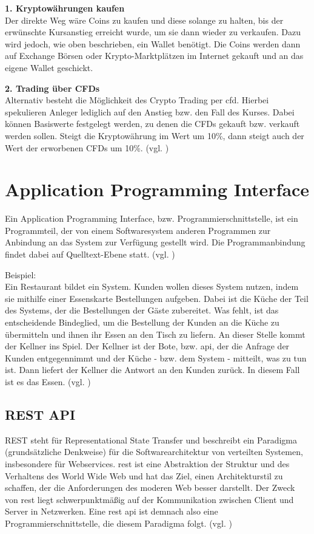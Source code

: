 \documentclass[oneside]{ausarbeitung}
\begin{document}
\textbf{1. Kryptowährungen kaufen} \\
Der direkte Weg wäre Coins zu kaufen und diese solange zu halten, bis
der erwünschte Kursanstieg erreicht wurde, um sie dann wieder zu
verkaufen. Dazu wird jedoch, wie oben beschrieben, ein Wallet
benötigt. Die Coins werden dann auf Exchange Börsen oder
Krypto-Marktplätzen im Internet gekauft und an das eigene Wallet
geschickt.  

\textbf{2. Trading über CFDs} \\
Alternativ besteht die Möglichkeit des Crypto Trading per \ac{cfd}.
Hierbei spekulieren Anleger lediglich auf den Anstieg bzw. den Fall
des Kurses. Dabei können Basiswerte festgelegt werden, zu
denen die CFDs gekauft bzw. verkauft werden sollen. Steigt die 
Kryptowährung im Wert um 10\%, dann steigt auch der Wert der 
erworbenen CFDs um 10\%. (vgl. \cite{crypto_trading})


\section{Application Programming Interface}
\label{sec:api}

Ein Application Programming Interface, bzw. Programmierschnittstelle,
ist ein Programmteil, der von einem Softwaresystem anderen Programmen
zur Anbindung an das System zur Verfügung gestellt wird. Die
Programmanbindung findet dabei auf Quelltext-Ebene statt. (vgl.
\cite{api_definition})

Beispiel: \\
Ein Restaurant bildet ein System. Kunden wollen dieses System nutzen,
indem sie mithilfe einer Essenskarte Bestellungen aufgeben. Dabei ist
die Küche der Teil des Systems, der die Bestellungen der Gäste
zubereitet. Was fehlt, ist das entscheidende Bindeglied, um die
Bestellung der Kunden an die Küche zu übermitteln und ihnen ihr
Essen an den Tisch zu liefern. An dieser Stelle kommt der Kellner ins
Spiel. Der Kellner ist der Bote, bzw. \ac{api}, der die Anfrage der
Kunden entgegennimmt und der Küche - bzw. dem System - mitteilt, was
zu tun ist. Dann liefert der Kellner die Antwort an den Kunden
zurück. In diesem Fall ist es das Essen. (vgl. \cite{api_example})    

\subsection{REST API}
\label{sub:rest_api}
REST steht für Representational State Transfer und beschreibt ein
Paradigma (grundsätzliche Denkweise) für die Softwarearchitektur von
verteilten Systemen, insbesondere für Webservices. \ac{rest} ist eine
Abstraktion der Struktur und des Verhaltens des World Wide Web und hat
das Ziel, einen Architekturstil zu schaffen, der die Anforderungen des
moderen Web besser darstellt. Der Zweck von \ac{rest} liegt
schwerpunktmäßig auf der Kommunikation zwischen Client und Server in
Netzwerken. Eine \ac{rest} \ac{api} ist demnach also eine
Programmierschnittstelle, die diesem Paradigma folgt. (vgl.
\cite{rest})
\end{document}
